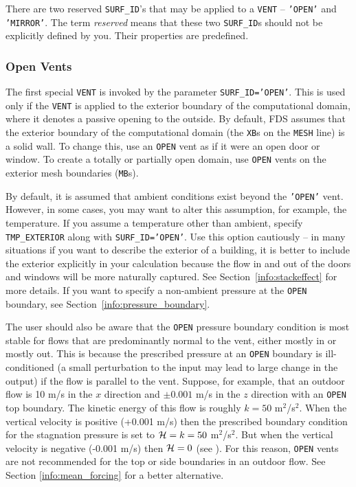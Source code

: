 \documentclass[11pt]{book}
\newcommand{\ct}{\tt\small}
\begin{document}
\label{info:Special_VENTS}

There are two reserved {\ct SURF\_ID}'s that may be applied to a {\ct VENT} -- {\ct 'OPEN'} and {\ct 'MIRROR'}. The term {\em reserved} means that these two
{\ct SURF\_ID}s should not be explicitly defined by you. Their properties are predefined.

\subsubsection{Open Vents}

The first special {\ct VENT} is invoked by the parameter {\ct SURF\_ID='OPEN'}. This is used only if the {\ct VENT} is applied to the exterior boundary of the computational domain, where it denotes a passive opening to the outside. By default, FDS assumes that the exterior boundary of the computational domain (the {\ct XB}s on the {\ct MESH} line) is a solid wall. To change this, use an {\ct OPEN} vent as if it were an open door or window. To create a totally or partially open domain, use {\ct OPEN} vents on the exterior mesh boundaries ({\ct MB}s).

By default, it is assumed that ambient conditions exist beyond the {\ct 'OPEN'} vent. However, in some cases, you may want to alter this assumption, for example, the temperature. If you assume a temperature other than ambient, specify {\ct TMP\_EXTERIOR} along with {\ct SURF\_ID='OPEN'}. Use this option cautiously -- in many situations if you want to describe the exterior of a building, it is better to include the exterior explicitly in your calculation because the flow in and out of the doors and windows will be more naturally captured. See Section~\ref{info:stackeffect} for more details. If you want to specify a non-ambient pressure at the {\ct OPEN} boundary, see Section~\ref{info:pressure_boundary}.

The user should also be aware that the {\ct OPEN} pressure boundary condition is most stable for flows that are predominantly normal  to the vent, either mostly in or mostly out.  This is because the prescribed pressure at an {\ct OPEN} boundary is ill-conditioned (a small perturbation to the input may lead to large change in the output) if the flow is parallel to the vent.  Suppose, for example, that an outdoor flow is 10 m/s in the $x$ direction and $\pm 0.001$ m/s in the $z$ direction with an {\ct OPEN} top boundary.  The kinetic energy of this flow is roughly $k=50$ m$^2$/s$^2$.  When the vertical velocity is positive (+0.001 m/s) then the prescribed boundary condition for the stagnation pressure is set to ${\cal H} = k = 50$ m$^2$/s$^2$.  But when the vertical velocity is negative (-0.001 m/s) then ${\cal H} = 0$ (see \cite{FDS_Tech_Guide}).  For this reason, {\ct OPEN} vents are not recommended for the top or side boundaries in an outdoor flow.  See Section \ref{info:mean_forcing} for a better alternative.
\end{document}
